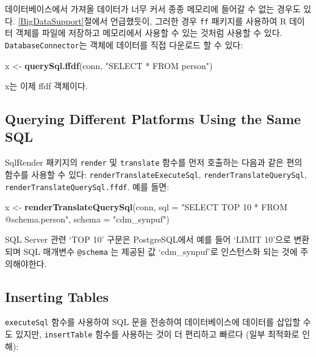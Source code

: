 \documentclass[11pt]{book}
\newenvironment{Shaded}{\begin{snugshade}}{\end{snugshade}}
\newcommand{\KeywordTok}[1]{\textcolor[rgb]{0.13,0.29,0.53}{\textbf{#1}}}
\newcommand{\DataTypeTok}[1]{\textcolor[rgb]{0.13,0.29,0.53}{#1}}
\newcommand{\StringTok}[1]{\textcolor[rgb]{0.31,0.60,0.02}{#1}}
\newcommand{\NormalTok}[1]{#1}
\theoremstyle{definition}
\theoremstyle{definition}
\theoremstyle{definition}
\theoremstyle{remark}
\begin{document}
데이터베이스에서 가져올 데이터가 너무 커서 종종 메모리에 들어갈 수 없는
경우도 있다. \ref{BigDataSupport}절에서 언급했듯이, 그러한 경우
\texttt{ff} 패키지를 사용하여 R 데이터 객체를 파일에 저장하고 메모리에서
사용할 수 있는 것처럼 사용할 수 있다. \texttt{DatabaseConnector}는
객체에 데이터를 직접 다운로드 할 수 있다:

\begin{Shaded}
\begin{Highlighting}[]
\NormalTok{x <-}\StringTok{ }\KeywordTok{querySql.ffdf}\NormalTok{(conn, }\StringTok{"SELECT * FROM person"}\NormalTok{)}
\end{Highlighting}
\end{Shaded}

x는 이제 ffdf 객체이다.

\subsection{Querying Different Platforms Using the Same
SQL}\label{querying-different-platforms-using-the-same-sql}

SqlRender 패키지의 \texttt{render} 및 \texttt{translate} 함수를 먼저
호출하는 다음과 같은 편의 함수를 사용할 수 있다:
\texttt{renderTranslateExecuteSql}, \texttt{renderTranslateQuerySql},
\texttt{renderTranslateQuerySql.ffdf}. 예를 들면:

\begin{Shaded}
\begin{Highlighting}[]
\NormalTok{x <-}\StringTok{ }\KeywordTok{renderTranslateQuerySql}\NormalTok{(conn, }
                             \DataTypeTok{sql =} \StringTok{"SELECT TOP 10 * FROM @schema.person"}\NormalTok{,}
                             \DataTypeTok{schema =} \StringTok{"cdm_synpuf"}\NormalTok{)}
\end{Highlighting}
\end{Shaded}

SQL Server 관련 `TOP 10' 구문은 PostgreSQL에서 예를 들어 `LIMIT 10'으로
변환되며 SQL 매개변수 \texttt{@schema} 는 제공된 값 `cdm\_synpuf'로
인스턴스화 되는 것에 주의해야한다.

\subsection{Inserting Tables}\label{inserting-tables}

\texttt{executeSql} 함수를 사용하여 SQL 문을 전송하여 데이터베이스에
데이터를 삽입할 수도 있지만, \texttt{insertTable} 함수를 사용하는 것이
더 편리하고 빠르다 (일부 최적화로 인해):
\end{document}
